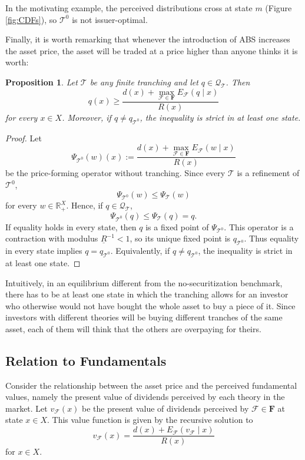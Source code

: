 \documentclass[11pt]{article}
\theoremstyle{plain}
\newtheorem{prp}{Proposition}%
\begin{document}
In the motivating example, the perceived distributions cross at state $m$ (Figure \ref{fig:CDFs}), so $\mathcal{T}^0$ is not issuer-optimal.

Finally, it is worth remarking that whenever the introduction of ABS increases the asset price, the asset will be traded at a price higher than anyone thinks it is worth:

\begin{prp} \label{rem:worth}
Let $\mathcal{T}$ be any finite tranching and let $q\in\mathcal{Q}_{\mathcal{T}}$. Then
\[
q(x)\geq
\frac{d(x)+
\max_{\mathcal{F}\in\mathbf{F}}
E_{\mathcal{F}}\left(q\mid x\right)}
{R(x)}
\]
for every $x\in X$. Moreover, if $q\neq q_{\mathcal{T}^0}$, the inequality is strict in at least one state.
\end{prp}

\begin{proof}
Let
\[
\Psi_{\mathcal{T}^0}(w)(x):=
\frac{d(x)+\max_{\mathcal{F}\in\mathbf{F}}E_{\mathcal{F}}(w\mid x)}{R(x)}
\]
be the price-forming operator without tranching. Since every $\mathcal{T}$ is a refinement of $\mathcal{T}^0$,
\[
\Psi_{\mathcal{T}^0}(w)\leq\Psi_{\mathcal{T}}(w)
\]
for every $w\in\mathbb{R}_+^X$. Hence, if $q\in\mathcal{Q}_{\mathcal{T}}$,
\[
\Psi_{\mathcal{T}^0}(q)\leq\Psi_{\mathcal{T}}(q)=q.
\]
If equality holds in every state, then $q$ is a fixed point of $\Psi_{\mathcal{T}^0}$. This operator is a contraction with modulus $\underline R^{-1}<1$, so its unique fixed point is $q_{\mathcal{T}^0}$. Thus equality in every state implies $q=q_{\mathcal{T}^0}$. Equivalently, if $q\neq q_{\mathcal{T}^0}$, the inequality is strict in at least one state.
\end{proof}

Intuitively, in an equilibrium different from the no-securitization benchmark, there has to be at least one state in which the tranching allows for an investor who otherwise would not have bought the whole asset to buy a piece of it. Since investors with different theories will be buying different tranches of the same asset, each of them will think that the others are overpaying for theirs.

\subsection{Relation to Fundamentals} \label{subsec:fun}

Consider the relationship between the asset price and the perceived fundamental values, namely the present value of dividends perceived by each theory in the market. Let $v_\mathcal{F}(x)$ be the present value of dividends perceived by $\mathcal{F}\in\mathbf{F}$ at state $x\in X$. This value function is given by the recursive solution to
\begin{equation} \label{equ:fund}
v_\mathcal{F}(x)
=
\frac{d(x)+E_{\mathcal{F}}\left(v_\mathcal{F}\mid x\right)}
{R(x)}
\end{equation}
for $x\in X$.
\end{document}
